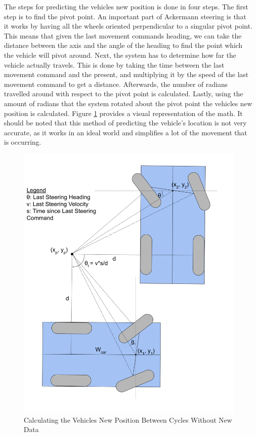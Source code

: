 \documentclass[titlepage,draft]{article}
\begin{document}
{The steps for predicting the vehicles new position is done in four steps. The first step is to find the pivot point. An important part of Ackermann steering is that it works by having all the wheels oriented perpendicular to a singular pivot point. This means that given the last movement commands heading, we can take the distance between the axis and the angle of the heading to find the point which the vehicle will pivot around. Next, the system has to determine how far the vehicle actually travels. This is done by taking the time between the last movement command and the present, and multiplying it by the speed of the last movement command to get a distance. Afterwards, the number of radians travelled around with respect to the pivot point is calculated. Lastly, using the amount of radians that the system rotated about the pivot point the vehicles new position is calculated. Figure \ref{fig:internal_update_determination} provides a visual representation of the math. It should be noted that this method of predicting the vehicle's location is not very accurate, as it works in an ideal world and simplifies a lot of the movement that is occurring.

\begin{figure}
	\centering
	\includegraphics[width=5in]{update_description}
	\caption{Calculating the Vehicles New Position Between Cycles Without New Data}
	\label{fig:internal_update_determination}
\end{figure}

}
\end{document}
